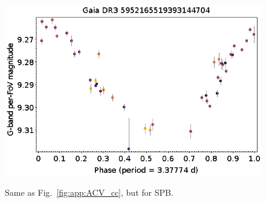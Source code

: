 \documentclass[longauth]{aa}
\begin{document}
\begin{appendix}
\begin{figure}
\hspace{2mm}
 \includegraphics[width=0.45\hsize]{figures/appendix/SPB-80.png} \\
\vspace{4mm}
 \caption{Same as Fig.~\ref{fig:app:ACV_cc}, but for SPB.}
 \label{fig:app:SPB_cc}
\end{figure}




\end{appendix}
\end{document}
